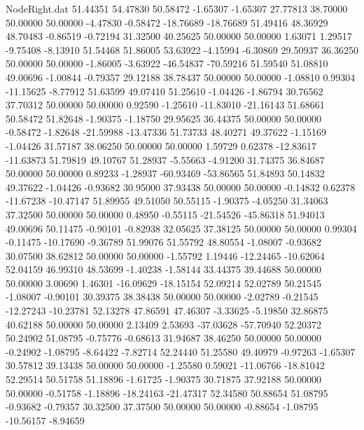 \begin{filecontents}{NodeRight.dat}
  51.44351   54.47830   50.58472    -1.65307   -1.65307   27.77813   38.70000   50.00000   50.00000   -4.47830   -0.58472  -18.76689  -18.76689
  51.49416   48.36929   48.70483    -0.86519   -0.72194   31.32500   40.25625   50.00000   50.00000    1.63071    1.29517   -9.75408   -8.13910
  51.54468   51.86005   53.63922    -4.15994   -6.30869   29.50937   36.36250   50.00000   50.00000   -1.86005   -3.63922  -46.54837  -70.59216
  51.59540   51.08810   49.00696    -1.00844   -0.79357   29.12188   38.78437   50.00000   50.00000   -1.08810    0.99304  -11.15625   -8.77912
  51.63599   49.07410   51.25610    -1.04426   -1.86794   30.76562   37.70312   50.00000   50.00000    0.92590   -1.25610  -11.83010  -21.16143
  51.68661   50.58472   51.82648    -1.90375   -1.18750   29.95625   36.44375   50.00000   50.00000   -0.58472   -1.82648  -21.59988  -13.47336
  51.73733   48.40271   49.37622    -1.15169   -1.04426   31.57187   38.06250   50.00000   50.00000    1.59729    0.62378  -12.83617  -11.63873
  51.79819   49.10767   51.28937    -5.55663   -4.91200   31.74375   36.84687   50.00000   50.00000    0.89233   -1.28937  -60.93469  -53.86565
  51.84893   50.14832   49.37622    -1.04426   -0.93682   30.95000   37.93438   50.00000   50.00000   -0.14832    0.62378  -11.67238  -10.47147
  51.89955   49.51050   50.55115    -1.90375   -4.05250   31.34063   37.32500   50.00000   50.00000    0.48950   -0.55115  -21.54526  -45.86318
  51.94013   49.00696   50.11475    -0.90101   -0.82938   32.05625   37.38125   50.00000   50.00000    0.99304   -0.11475  -10.17690   -9.36789
  51.99076   51.55792   48.80554    -1.08007   -0.93682   30.07500   38.62812   50.00000   50.00000   -1.55792    1.19446  -12.24465  -10.62064
  52.04159   46.99310   48.53699    -1.40238   -1.58144   33.44375   39.44688   50.00000   50.00000    3.00690    1.46301  -16.09629  -18.15154
  52.09214   52.02789   50.21545    -1.08007   -0.90101   30.39375   38.38438   50.00000   50.00000   -2.02789   -0.21545  -12.27243  -10.23781
  52.13278   47.86591   47.46307    -3.33625   -5.19850   32.86875   40.62188   50.00000   50.00000    2.13409    2.53693  -37.03628  -57.70940
  52.20372   50.24902   51.08795    -0.75776   -0.68613   31.94687   38.46250   50.00000   50.00000   -0.24902   -1.08795   -8.64422   -7.82714
  52.24440   51.25580   49.40979    -0.97263   -1.65307   30.57812   39.13438   50.00000   50.00000   -1.25580    0.59021  -11.06766  -18.81042
  52.29514   50.51758   51.18896    -1.61725   -1.90375   30.71875   37.92188   50.00000   50.00000   -0.51758   -1.18896  -18.24163  -21.47317
  52.34580   50.88654   51.08795    -0.93682   -0.79357   30.32500   37.37500   50.00000   50.00000   -0.88654   -1.08795  -10.56157   -8.94659

\end{filecontents}

